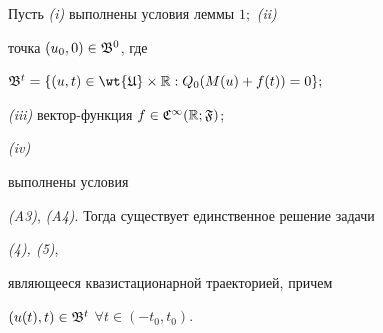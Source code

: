 \begin{thm} Пусть {\em (i)} выполнены условия леммы $1;$ {\em (ii)}


точка $(u_0,0)\in\frak B^0$, где


$\frak B^t=\{(u,t)\in\wt{\frak U}\times\Bbb R:


Q_0(M(u)+f(t))=0\};$


{\em (iii)} вектор-функция $f\in\frak C^\infty(\Bbb R;\frak F)$;


{\em (iv)}


выполнены условия


{\em (A3)}, {\em (A4)}. Тогда существует единственное решение задачи


{\em (4), (5)},


являющееся квазистационарной траекторией, причем


$(u(t),t)\in\frak B^t$ $\forall t\in(-t_0,t_0)$.


\end{thm}





